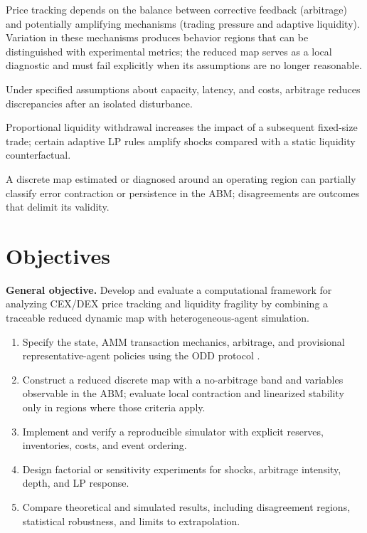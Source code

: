 Price tracking depends on the balance between corrective feedback (arbitrage) and
potentially amplifying mechanisms (trading pressure and adaptive liquidity). Variation
in these mechanisms produces behavior regions that can be distinguished with
experimental metrics; the reduced map serves as a local diagnostic and must fail
explicitly when its assumptions are no longer reasonable.

\begin{description}[style=nextline]
  \item[H1a.] Under specified assumptions about capacity, latency, and costs,
    arbitrage reduces discrepancies after an isolated disturbance.
  \item[H1b.] Proportional liquidity withdrawal increases the impact of a subsequent
    fixed-size trade; certain adaptive LP rules amplify shocks compared with a static
    liquidity counterfactual.
  \item[H1c.] A discrete map estimated or diagnosed around an operating region can
    partially classify error contraction or persistence in the ABM; disagreements are
    outcomes that delimit its validity.
\end{description}

\section{Objectives}

\textbf{General objective.} Develop and evaluate a computational framework for
analyzing CEX/DEX price tracking and liquidity fragility by combining a traceable
reduced dynamic map with heterogeneous-agent simulation.

\begin{enumerate}
  \item Specify the state, AMM transaction mechanics, arbitrage, and provisional
    representative-agent policies using the ODD protocol \cite{grimm2020odd}.
  \item Construct a reduced discrete map with a no-arbitrage band and variables
    observable in the ABM; evaluate local contraction and linearized stability only in
    regions where those criteria apply.
  \item Implement and verify a reproducible simulator with explicit reserves,
    inventories, costs, and event ordering.
  \item Design factorial or sensitivity experiments for shocks, arbitrage intensity,
    depth, and LP response.
  \item Compare theoretical and simulated results, including disagreement regions,
    statistical robustness, and limits to extrapolation.
\end{enumerate}
